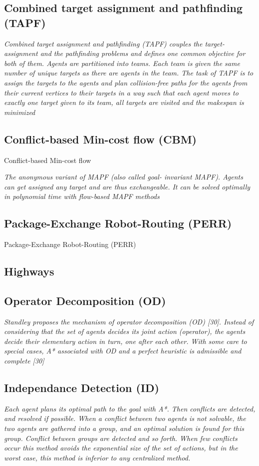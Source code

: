 \documentclass[a4paper,11pt]{article}
\begin{document}
\subsection{Combined target assignment and pathfinding (TAPF)}

\textit{Combined target assignment and pathfinding (TAPF) couples the target-assignment and the pathfinding problems and defines one common objective for both of them. Agents are partitioned into teams.
Each team is given the same number of unique targets as there are agents in the team. The task of TAPF is to assign the targets to the agents and plan collision-free paths for the agents from their current vertices to their targets in a way such that each agent moves to exactly one target given to its team, all targets are visited and the makespan is minimized}

\subsection{Conflict-based Min-cost flow (CBM)}
Conflict-based Min-cost flow

\textit{The anonymous variant of MAPF (also called goal- invariant MAPF). Agents can get assigned any target and are thus exchangeable. It can be solved optimally in polynomial time with flow-based MAPF methods}

\subsection{Package-Exchange Robot-Routing (PERR)}
Package-Exchange Robot-Routing (PERR)

\subsection{Highways}
\cite{cohen2016bounded}

\subsection{Operator Decomposition (OD)}
\textit{Standley proposes the mechanism of operator decomposition (OD) [30]. Instead of considering that the set of agents decides its joint action (operator), the agents decide their elementary action in turn, one after each other. With some care to special cases, A* associated with OD and a perfect heuristic is admissible and complete [30]}

\subsection{Independance Detection (ID)}
\textit{Each agent plans its optimal path to the goal with A*. Then conflicts are detected, and resolved if possible. When a conflict between two agents is not solvable, the two agents are gathered into a group, and an optimal solution is found for this group. Conflict between groups are detected and so forth. When few conflicts occur this method avoids the exponential size of the set of actions, but in the worst case, this method is inferior to any centralized method.}
\end{document}
